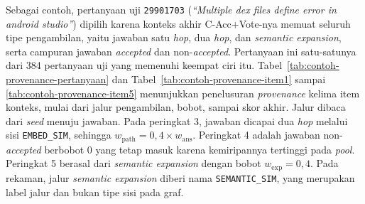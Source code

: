 Sebagai contoh, pertanyaan uji \texttt{29901703} (\emph{``Multiple dex files define error in android studio''}) dipilih karena konteks akhir C-Acc+Vote-nya memuat seluruh tipe pengambilan, yaitu jawaban satu \emph{hop}, dua \emph{hop}, dan \emph{semantic expansion}, serta campuran jawaban \emph{accepted} dan non-\emph{accepted}. Pertanyaan ini satu-satunya dari 384 pertanyaan uji yang memenuhi keempat ciri itu. Tabel~\ref{tab:contoh-provenance-pertanyaan} dan Tabel~\ref{tab:contoh-provenance-item1} sampai \ref{tab:contoh-provenance-item5} menunjukkan penelusuran \emph{provenance} kelima item konteks, mulai dari jalur pengambilan, bobot, sampai skor akhir. Jalur dibaca dari \emph{seed} menuju jawaban. Pada peringkat 3, jawaban dicapai dua \emph{hop} melalui sisi \texttt{EMBED\_SIM}, sehingga $w_{\mathrm{path}}=0{,}4\times w_{\mathrm{ans}}$. Peringkat 4 adalah jawaban non-\emph{accepted} berbobot 0 yang tetap masuk karena kemiripannya tertinggi pada \emph{pool}. Peringkat 5 berasal dari \emph{semantic expansion} dengan bobot $w_{\mathrm{exp}}=0{,}4$. Pada rekaman, jalur \emph{semantic expansion} diberi nama \texttt{SEMANTIC\_SIM}, yang merupakan label jalur dan bukan tipe sisi pada graf.


\newcommand{\kartuitem}[9]{%
\begin{table}[!htbp]
\centering
\small
\caption{Item konteks peringkat #1 pada pertanyaan uji \texttt{29901703}.}
\label{tab:contoh-provenance-item#1}
\renewcommand{\arraystretch}{1.3}
\begin{tabularx}{\textwidth}{|>{\bfseries\raggedright\arraybackslash}p{3.2cm}|X|}
\hline
\multicolumn{2}{|l|}{\textbf{Peringkat #1 \quad (jawaban \texttt{#2})}} \\
\hline
Jalur pengambilan & #3 \\
\hline
Pertanyaan asal & #4 \\
\hline
Isi jawaban & #5 \\
\hline
Penilaian pengguna & #6 \\
\hline
Bobot & #7 \\
\hline
Relevansi & #8 \\
\hline
Skor akhir & #9 \\
\hline
\end{tabularx}
\end{table}}

